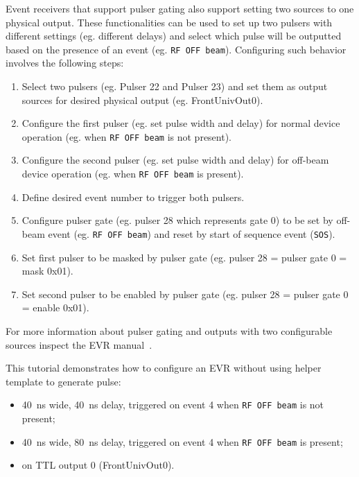\documentclass[12pt,a4paper]{article}
\begin{document}
Event receivers that support pulser gating also support setting two sources to one physical output. These functionalities can be used to set up two pulsers with different settings (eg. different delays) and select which pulse will be outputted based on the presence of an event (eg. \texttt{RF OFF beam}). Configuring such behavior involves the following steps:
\begin{enumerate}
\item Select two pulsers (eg. Pulser 22 and Pulser 23) and set them as output sources for desired physical output (eg. FrontUnivOut0). \label{mps_steps:selectPulsers}
\item Configure the first pulser (eg. set pulse width and delay) for normal device operation (eg. when \texttt{RF OFF beam} is not present). \label{mps_steps:configurePulser1}
\item Configure the second pulser (eg. set pulse width and delay) for off-beam device operation (eg. when \texttt{RF OFF beam} is present). \label{mps_steps:configurePulser2}
\item Define desired event number to trigger both pulsers.  \label{mps_steps:triggerEvent}
\item Configure pulser gate (eg. pulser 28 which represents gate 0) to be set by off-beam event (eg. \texttt{RF OFF beam}) and reset by start of sequence event (\texttt{SOS}). \label{mps_steps:setupGate}
\item Set first pulser to be masked by pulser gate (eg. pulser 28 = pulser gate 0 = mask 0x01). \label{mps_steps:setPulserMask}
\item Set second pulser to be enabled by pulser gate (eg. pulser 28 = pulser gate 0 = enable 0x01). \label{mps_steps:setPulserEnable}
\end{enumerate}
For more information about pulser gating and outputs with two configurable sources inspect the EVR manual~\cite{evr_manual}.

This tutorial demonstrates how to configure an EVR without using helper template to generate pulse:
\begin{itemize}
\item 40~ns wide, 40~ns delay, triggered on event 4 when \texttt{RF OFF beam} is not present;
\item 40~ns wide, 80~ns delay, triggered on event 4 when \texttt{RF OFF beam} is present;
\item on TTL output 0 (FrontUnivOut0).
\end{itemize}
\end{document}
